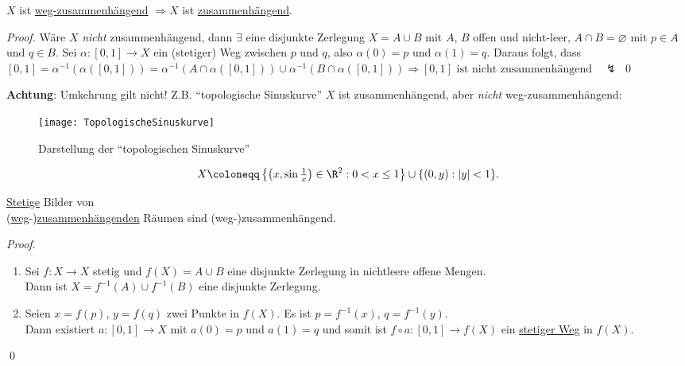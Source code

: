 \begin{lemma}
  \( X \) ist \hyperref[def:wegzusammenhaengend]{weg-zusammenhängend} \( \Rightarrow X \) ist \hyperref[def:zusammenhaengend]{zusammenhängend}.
  \begin{proof}
    Wäre \( X \) \emph{nicht} zusammenhängend, dann \( \exists \) eine disjunkte Zerlegung \( X = A \cup B \) mit \( A \), \( B \) offen und nicht-leer, \( A \cap B = \varnothing \) mit \( p \in A \) und \( q \in B \). Sei \( \alpha: [0,1] \to X \) ein (stetiger) Weg zwischen \( p \) und \( q \), also \( \alpha(0) = p \) und \( \alpha(1) = q \). Daraus folgt, dass \( [0,1] = \alpha^{-1}(\alpha([0,1])) = \alpha^{-1}(A \cap \alpha([0,1])) \cup \alpha^{-1}(B \cap \alpha([0,1])) \Rightarrow [0,1] \text{ ist nicht zusammenhängend} \quad \lightning \) \qed{}
  \end{proof}

  \begin{minipage}{.45\textwidth}
    \textbf{Achtung}: Umkehrung gilt nicht! Z.B. ``topologische Sinuskurve''\footnotemark{} \( X \) ist zusammenhängend, aber \emph{nicht} weg-zusammenhängend:
  \end{minipage}
  \hfill
  \begin{minipage}{.45\textwidth}
    \begin{figure}[H]
      \texttt{[image: TopologischeSinuskurve]}
      \caption{Darstellung der ``topologischen Sinuskurve''}
    \end{figure}
  \end{minipage}
  \begin{equation*}
    X \coloneqq \left \{ \left( x, \sin\tfrac{1}{x} \right) \in \R^2 : 0 < x \leq 1 \right \} \cup \{ (0,y) : \vert y \vert < 1 \}\text{.}
  \end{equation*}
\end{lemma}

\begin{lemma}
  \hyperref[def:stetig]{Stetige} Bilder von \\ (\hyperref[def:wegzusammenhaengend]{weg}-)\hyperref[def:zusammenhaengend]{zusammenhängenden} Räumen sind (weg-)zusammenhängend.
  \begin{proof}
    \
    \begin{enumerate}
      \item Sei \( f: X \to X \) stetig und \( f(X) = A \cup B \) eine disjunkte Zerlegung in nichtleere offene Mengen. \\
        Dann ist \( X = f^{-1}(A) \cup f^{-1}(B) \) eine disjunkte Zerlegung.
      \item Seien \( x = f(p) \), \( y = f(q) \) zwei Punkte in \( f(X) \). Es ist \( p = f^{-1}(x) \), \( q = f^{-1}(y) \). \\
        Dann existiert \( a: [0,1] \to X \) mit \( a(0) = p \) und \( a(1) = q \) und somit ist \( f \circ a: [0,1] \to f(X) \) ein \hyperref[def:wegzusammenhaengend]{stetiger Weg} in \( f(X) \). 
    \end{enumerate}
    \qed{}
  \end{proof}
\end{lemma}

